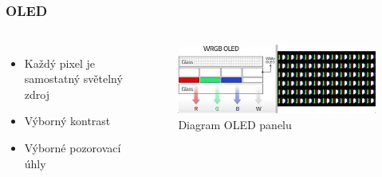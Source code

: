 \documentclass[aspectratio=169,11pt, allowframebreak=0.9]{beamer}
\begin{document}
    \subsection{}
    \begin{frame}
    \frametitle{OLED}
    \begin{columns}
    \begin{itemize}
        \item Každý pixel je samostatný světelný zdroj
        \item Výborný kontrast
        \item Výborné pozorovací úhly
    \end{itemize}
    \begin{figure}
        \centering
        \includegraphics[width=1\textwidth]{oled}
        \caption{Diagram OLED panelu}
    \end{figure}
    \end{columns}
    \end{frame}
\end{document}
